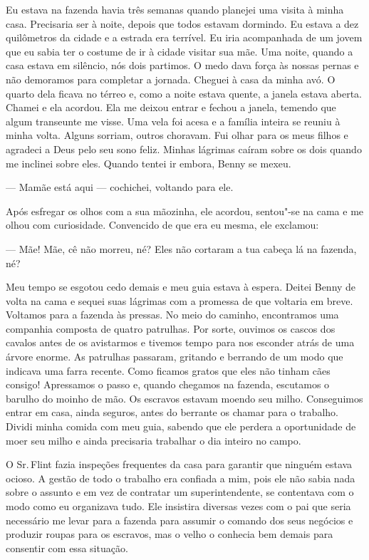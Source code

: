 Eu estava na fazenda havia três semanas
quando planejei uma visita à minha casa. Precisaria ser à noite, depois
que todos estavam dormindo. Eu estava a dez quilômetros da cidade e a
estrada era terrível. Eu iria acompanhada de um jovem que eu sabia ter o
costume de ir à cidade visitar sua mãe. Uma noite, quando a casa estava
em silêncio, nós dois partimos. O medo dava força às nossas pernas e não
demoramos para completar a jornada. Cheguei à casa da minha avó. O
quarto dela ficava no térreo e, como a noite estava quente, a janela
estava aberta. Chamei e ela acordou. Ela me deixou entrar e fechou a
janela, temendo que algum transeunte me visse. Uma vela foi acesa e a
família inteira se reuniu à minha volta. Alguns sorriam, outros
choravam. Fui olhar para os meus filhos e agradeci a Deus pelo seu sono
feliz. Minhas lágrimas caíram sobre os dois quando me inclinei sobre
eles. Quando tentei ir embora, Benny se mexeu.

--- Mamãe está aqui --- cochichei, voltando para ele.

Após esfregar os olhos com a sua mãozinha, ele acordou, sentou"-se na
cama e me olhou com curiosidade. Convencido de que era eu mesma, ele
exclamou:

--- Mãe! Mãe, cê não morreu, né? Eles não cortaram a tua cabeça lá na
fazenda, né?

Meu tempo se esgotou cedo demais e meu
guia estava à espera. Deitei Benny de volta na cama e sequei suas
lágrimas com a promessa de que voltaria em breve. Voltamos para a
fazenda às pressas. No meio do caminho, encontramos uma companhia
composta de quatro patrulhas. Por sorte, ouvimos os cascos dos cavalos
antes de os avistarmos e tivemos tempo para nos esconder atrás de uma
árvore enorme. As patrulhas passaram, gritando e berrando de um modo que
indicava uma farra recente. Como ficamos gratos que eles não tinham cães
consigo! Apressamos o passo e, quando chegamos na fazenda, escutamos o
barulho do moinho de mão. Os escravos estavam moendo seu milho.
Conseguimos entrar em casa, ainda seguros, antes do berrante os chamar
para o trabalho. Dividi minha comida com meu guia, sabendo que ele
perdera a oportunidade de moer seu milho e ainda precisaria trabalhar o
dia inteiro no campo.

O Sr.\,Flint fazia inspeções frequentes
da casa para garantir que ninguém estava ocioso. A gestão de todo o
trabalho era confiada a mim, pois ele não sabia nada sobre o assunto e
em vez de contratar um superintendente, se contentava com o modo como eu
organizava tudo. Ele insistira diversas vezes com o pai que seria
necessário me levar para a fazenda para assumir o comando dos seus
negócios e produzir roupas para os escravos, mas o velho o conhecia bem
demais para consentir com essa situação.

